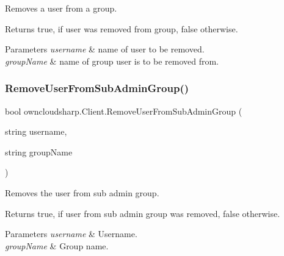 Removes a user from a group. 

\begin{DoxyReturn}{Returns}
{\ttfamily true}, if user was removed from group, {\ttfamily false} otherwise.
\end{DoxyReturn}

\begin{DoxyParams}{Parameters}
{\em username} & name of user to be removed.\\
\hline
{\em group\+Name} & name of group user is to be removed from.\\
\hline
\end{DoxyParams}
\mbox{\label{classowncloudsharp_1_1_client_adc52bbdd5e176151e3ba3c51184872dc}} 
\subsubsection{\texorpdfstring{Remove\+User\+From\+Sub\+Admin\+Group()}{RemoveUserFromSubAdminGroup()}}
{\footnotesize\ttfamily bool owncloudsharp.\+Client.\+Remove\+User\+From\+Sub\+Admin\+Group (\begin{DoxyParamCaption}\item[{string}]{username,  }\item[{string}]{group\+Name }\end{DoxyParamCaption})}



Removes the user from sub admin group. 

\begin{DoxyReturn}{Returns}
{\ttfamily true}, if user from sub admin group was removed, {\ttfamily false} otherwise.
\end{DoxyReturn}

\begin{DoxyParams}{Parameters}
{\em username} & Username.\\
\hline
{\em group\+Name} & Group name.\\
\hline
\end{DoxyParams}
\mbox{\label{classowncloudsharp_1_1_client_af303c729824dbe2ab788273f58f0804a}} 
